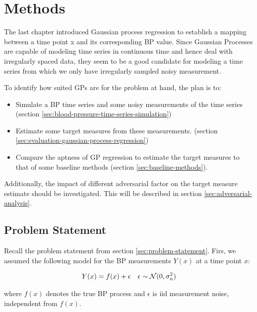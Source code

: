 \chapter{Methods}\label{ch:methods}

The last chapter introduced Gaussian process regression
to establish a mapping between a time point x and its
corresponding BP value.
Since Gaussian Processes are capable of modeling time series in continuous
time and hence deal with irregularly spaced data,
they seem to be a good candidate for modeling a time series from which
we only have irregularly sampled noisy measurement.


To identify how suited GPs are for the problem at hand, the plan is to:
\begin{itemize}
    \item Simulate a BP time series and some noisy measurements of the time series
    (section \ref{sec:blood-pressure-time-series-simulation})
    \item Estimate some target measures from these measurements.
    (section \ref{sec:evaluation-gaussian-process-regression})
    \item Compare the aptness of GP regression to estimate the target measures
    to that of some baseline methods (section \ref{sec:baseline-methods}).

\end{itemize}

Additionally, the impact of different adversarial factor on the target measure estimate
should be investigated.
This will be described in section \ref{sec:adversarial-analysis}.


\section{Problem Statement}

Recall the problem statement from section \ref{sec:problem-statement}.
Firs, we assumed the following model for the BP measurements
$Y(x)$ at a time point $x$:

\begin{align*}
    Y(x) = f(x) + \epsilon && \epsilon \sim \operatorname{\mathcal{N}}(0, \sigma_n^{2})
\end{align*}

where $f(x)$ denotes the true BP process and $\epsilon$ is iid measurement noise,
independent from $f(x)$.

